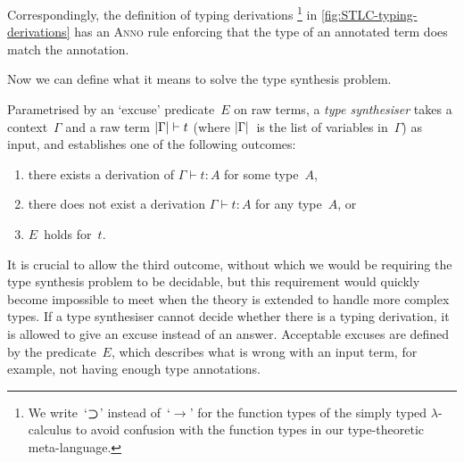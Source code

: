 Correspondingly, the definition of typing derivations%
\footnote{We write~`$\mathbin{\bm{\supset}}$' instead of~`$\to$' for the function types of the simply typed $\lambda$-calculus to avoid confusion with the function types in our type-theoretic meta-language.}
in \cref{fig:STLC-typing-derivations} has an \textsc{Anno} rule enforcing that the type of an annotated term does match the annotation.

Now we can define what it means to solve the type synthesis problem.

\begin{defn}
\label{def:STLC-type-synthesiser}
Parametrised by an `excuse' predicate~$E$ on raw terms, a \emph{type synthesiser} takes a context~$\Gamma$ and a raw term $\left|\Gamma\right| \vdash t$ (where $\left|\Gamma\right|$~is the list of variables in~$\Gamma$) as input, and establishes one of the following outcomes:
\begin{enumerate}
\item there exists a derivation of $\Gamma \vdash t : A$ for some type~$A$,
\item there does not exist a derivation $\Gamma \vdash t : A$ for any type~$A$, or
\item $E$~holds for~$t$.
\end{enumerate}
\end{defn}

It is crucial to allow the third outcome, without which we would be requiring the type synthesis problem to be decidable, but this requirement would quickly become impossible to meet when the theory is extended to handle more complex types.
If a type synthesiser cannot decide whether there is a typing derivation, it is allowed to give an excuse instead of an answer.
Acceptable excuses are defined by the predicate~$E$, which describes what is wrong with an input term, for example, not having enough type annotations.


